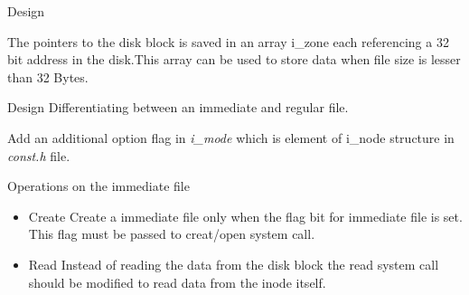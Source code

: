 \documentclass{beamer}
\begin{document}
%

\begin{frame}{Design}
\begin{tiny}

\end{tiny}

The pointers to the disk block is saved in an array i\_zone each referencing a 32 bit address in the disk.This array can be used to store data when file size is lesser than 32 Bytes. 
\end{frame}




\begin{frame}{Design}
Differentiating between an immediate and regular file. \linebreak
\begin{small}
Add an additional option flag in { \em i\_mode } which is element of i\_node structure in { \em const.h} file. 
\end{small}
\begin{tiny}

\end{tiny}
\end{frame}

\begin{frame}{Operations on the immediate file}
\begin{itemize}
\item Create \linebreak
Create a immediate file only when the flag bit for immediate file is set. This flag must be passed to creat/open system call.\linebreak
\item Read \linebreak
Instead of reading the data from the disk block the read system call should be modified to read data from the inode itself. \linebreak
\end{itemize}
\end{frame}
\end{document}
